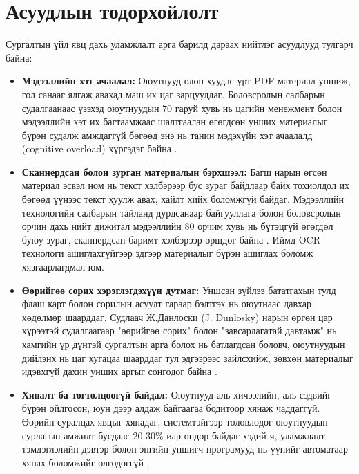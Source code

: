 \section{Асуудлын тодорхойлолт}
Сургалтын үйл явц дахь уламжлалт арга барилд дараах нийтлэг асуудлууд тулгарч байна:
\begin{itemize}
    \item \textbf{Мэдээллийн хэт ачаалал:} Оюутнууд олон хуудас урт PDF материал уншиж, гол санааг ялгаж авахад маш их цаг зарцуулдаг. Боловсролын салбарын судалгаанаас үзэхэд оюутнуудын 70 гаруй хувь нь цагийн менежмент болон мэдээллийн хэт их багтаамжаас шалтгаалан өгөгдсөн унших материалыг бүрэн судалж амждаггүй бөгөөд энэ нь танин мэдэхүйн хэт ачаалалд (cognitive overload) хүргэдэг байна \cite{sweller2011cognitive, berry2010student}.
    
    \item \textbf{Сканнердсан болон зурган материалын бэрхшээл:} Багш нарын өгсөн материал эсвэл ном нь текст хэлбэрээр бус зураг байдлаар байх тохиолдол их бөгөөд үүнээс текст хуулж авах, хайлт хийх боломжгүй байдаг. Мэдээллийн технологийн салбарын тайланд дурдсанаар байгууллага болон боловсролын орчин дахь нийт дижитал мэдээллийн 80 орчим хувь нь бүтэцгүй өгөгдөл буюу зураг, сканнердсан баримт хэлбэрээр оршдог байна \cite{shukla2022unstructured}. Иймд OCR технологи ашиглахгүйгээр эдгээр материалыг бүрэн ашиглах боломж хязгаарлагдмал юм.
    
    \item \textbf{Өөрийгөө сорих хэрэглэгдэхүүн дутмаг:} Уншсан зүйлээ бататгахын тулд флаш карт болон сорилын асуулт гараар бэлтгэх нь оюутнаас давхар хөдөлмөр шаарддаг. Судлаач Ж.Данлоски (J. Dunlosky) нарын өргөн цар хүрээтэй судалгаагаар "өөрийгөө сорих" болон "завсарлагатай давтамж" нь хамгийн үр дүнтэй сургалтын арга болох нь батлагдсан боловч, оюутнуудын дийлэнх нь цаг хугацаа шаарддаг тул эдгээрээс зайлсхийж, зөвхөн материалыг идэвхгүй дахин унших аргыг сонгодог байна \cite{dunlosky2013improving}.
    
    \item \textbf{Хяналт ба тогтолцоогүй байдал:} Оюутнууд аль хичээлийн, аль сэдвийг бүрэн ойлгосон, юун дээр алдаж байгаагаа бодитоор хянаж чаддаггүй. Өөрийн суралцах явцыг хянадаг, системтэйгээр төлөвлөдөг оюутнуудын сурлагын амжилт бусдаас 20-30\%-иар өндөр байдаг хэдий ч, уламжлалт тэмдэглэлийн дэвтэр болон энгийн уншигч програмууд нь үүнийг автоматаар хянах боломжийг олгодоггүй \cite{zimmerman2002becoming}.
\end{itemize}


